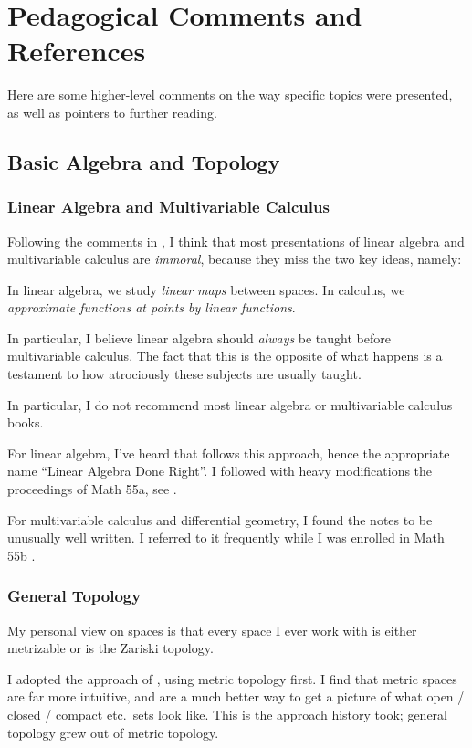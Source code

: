 \chapter{Pedagogical Comments and References}
\label{ch:refs}
Here are some higher-level comments on the way specific topics were presented,
as well as pointers to further reading.

\section{Basic Algebra and Topology}
\subsection{Linear Algebra and Multivariable Calculus}
Following the comments in ,
I think that most presentations of linear algebra and multivariable calculus
are \emph{immoral}, because they miss the two key ideas, namely:
\begin{itemize}
	\ii In linear algebra, we study \emph{linear maps} between spaces.
	\ii In calculus, we \emph{approximate functions at points by linear functions}.
\end{itemize}
In particular, I believe linear algebra should \emph{always} be taught
before multivariable calculus.
The fact that this is the opposite of what happens is a testament to how
atrociously these subjects are usually taught.

In particular, I do not recommend most linear algebra or
multivariable calculus books.

For linear algebra, I've heard that \cite{ref:axler} follows this approach,
hence the appropriate name ``Linear Algebra Done Right''.
I followed with heavy modifications the proceedings of Math 55a,
see \cite{ref:55a}.

For multivariable calculus and differential geometry,
I found the notes \cite{ref:manifolds} to be unusually well written.
I referred to it frequently while I was enrolled in Math 55b \cite{ref:55b}.

\subsection{General Topology}
My personal view on spaces is that every space I ever work with
is either metrizable or is the Zariski topology.

I adopted the approach of \cite{ref:pugh}, using metric topology first.
I find that metric spaces are far more intuitive, and are a much better
way to get a picture of what open / closed / compact etc.\ sets look like.
This is the approach history took; general topology grew out of metric topology.

